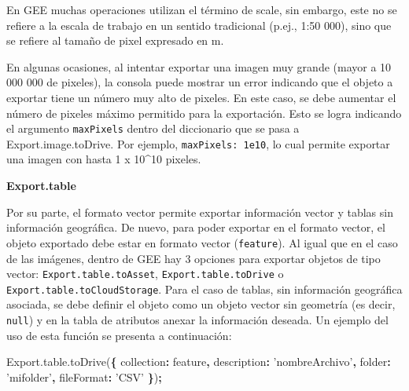 \documentclass[
]{article}
\newenvironment{Shaded}{\begin{snugshade}}{\end{snugshade}}
\newcommand{\AttributeTok}[1]{\textcolor[rgb]{0.77,0.63,0.00}{#1}}
\newcommand{\DataTypeTok}[1]{\textcolor[rgb]{0.13,0.29,0.53}{#1}}
\newcommand{\NormalTok}[1]{#1}
\newcommand{\OperatorTok}[1]{\textcolor[rgb]{0.81,0.36,0.00}{\textbf{#1}}}
\newcommand{\StringTok}[1]{\textcolor[rgb]{0.31,0.60,0.02}{#1}}
\newcommand{\VariableTok}[1]{\textcolor[rgb]{0.00,0.00,0.00}{#1}}
\begin{document}
\begin{tipblock}
En GEE muchas operaciones utilizan el término de scale, sin embargo,
este no se refiere a la escala de trabajo en un sentido tradicional
(p.ej., 1:50 000), sino que se refiere al tamaño de pixel expresado en
m.

\end{tipblock}

\begin{tipblock}
En algunas ocasiones, al intentar exportar una imagen muy grande (mayor
a 10 000 000 de pixeles), la consola puede mostrar un error indicando
que el objeto a exportar tiene un número muy alto de pixeles. En este
caso, se debe aumentar el número de pixeles máximo permitido para la
exportación. Esto se logra indicando el argumento \texttt{maxPixels}
dentro del diccionario que se pasa a Export.image.toDrive. Por ejemplo,
\texttt{maxPixels:\ 1e10}, lo cual permite exportar una imagen con hasta
1 x 10\^{}10 pixeles.

\end{tipblock}

\textbf{Export.table}

Por su parte, el formato vector permite exportar información vector y
tablas sin información geográfica. De nuevo, para poder exportar en el
formato vector, el objeto exportado debe estar en formato vector
(\texttt{feature}). Al igual que en el caso de las imágenes, dentro de
GEE hay 3 opciones para exportar objetos de tipo vector:
\texttt{Export.table.toAsset}, \texttt{Export.table.toDrive} o
\texttt{Export.table.toCloudStorage}. Para el caso de tablas, sin
información geográfica asociada, se debe definir el objeto como un
objeto vector sin geometría (es decir, \texttt{null}) y en la tabla de
atributos anexar la información deseada. Un ejemplo del uso de esta
función se presenta a continuación:

\begin{Shaded}
\begin{Highlighting}[]
\VariableTok{Export}\NormalTok{.}\VariableTok{table}\NormalTok{.}\AttributeTok{toDrive}\NormalTok{(}\OperatorTok{\{}
    \DataTypeTok{collection}\OperatorTok{:}\NormalTok{ feature}\OperatorTok{,}
    \DataTypeTok{description}\OperatorTok{:} \StringTok{'nombreArchivo'}\OperatorTok{,}
    \DataTypeTok{folder}\OperatorTok{:} \StringTok{'mifolder'}\OperatorTok{,}
    \DataTypeTok{fileFormat}\OperatorTok{:} \StringTok{'CSV'}
 \OperatorTok{\}}\NormalTok{)}\OperatorTok{;}
\end{Highlighting}
\end{Shaded}
\end{document}
